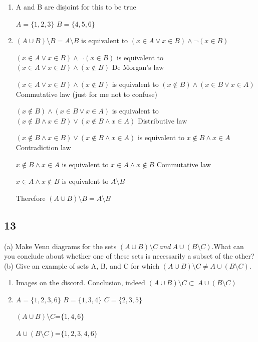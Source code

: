 \documentclass{article}
\begin{document}
\begin{enumerate}[label=(\alph*)]
    \item 
   A and B are disjoint for this to be true
   
   $A=\{1,2,3 \}$
   $B=\{4,5,6 \}$
   
    \item
    $(A \cup B) \setminus B = A \setminus B$ is equivalent to $(x \in A \lor x \in B) \land \neg (x \in B)$ 
    
    $(x \in A \lor x \in B) \land \neg (x \in B)$ is equivalent to $(x \in A \lor x \in B) \land  (x \notin B)$ De Morgan's law
    
    $(x \in A \lor x \in B) \land  (x \notin B)$ is equivalent to $(x \notin B) \land (x \in B \lor x \in A)$ Commutative law (just for me not to confuse)
    
    $(x \notin B) \land (x \in B \lor x \in A)$ is equivalent to $(x\notin B \land x \in B ) \lor (x \notin B \land x \in A)$ Distributive law
    
    $(x\notin B \land x \in B ) \lor (x \notin B \land x \in A)$ is equivalent to $x\notin B \land x \in A$ Contradiction law
    
    $x\notin B \land x \in A$ is equivalent to  $x\in A \land x \notin B$ Commutative law
    
    $x\in A \land x \notin B$ is equivalent to $A \setminus B$
    
    Therefore $(A \cup B) \setminus B = A \setminus B$
\end{enumerate}
\subsection{13}
(a) Make Venn diagrams for the sets $(A \cup B) \setminus C  \ and  \ A \cup (B \setminus C)$.What can you conclude about whether one of these sets is
necessarily a subset of the other?
(b) Give an example of sets A, B, and C for which $(A \cup B) \setminus C \neq A \cup (B \setminus C)$.

\begin{enumerate}[label=(\alph*)]
    \item 
    Images on the discord.
    Conclusion, indeed $(A \cup B) \setminus C  \subset  \ A \cup (B \setminus C)$
    \item
    $A= \{1,2,3,6 \}$
    $B= \{1,3,4 \}$
    $C= \{2,3,5 \}$
    
    $(A \cup B) \setminus C$=$\{ 1,4,6\}$ 
    
    $A \cup (B \setminus C)$=$\{1,2,3,4,6 \}$
\end{enumerate}
\end{document}

